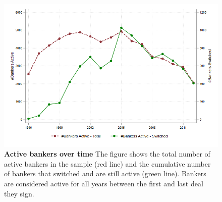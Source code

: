 \begin{figure}[H]
	\caption{\textbf{Active bankers over time} \newline
		The figure shows the total number of active bankers in the sample (red line) and the cumulative number of bankers that switched and are still active (green line). Bankers are considered active for all years between the first and last deal they sign.}
	\label{fig:no_bankers}
	\centering
	\includegraphics[angle=0,  scale=0.6]{figures/active_bankers_over_time.png}
\end{figure}
\clearpage \newpage

